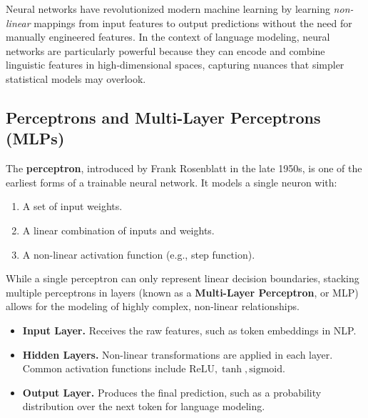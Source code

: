 \noindent
Neural networks have revolutionized modern machine learning by learning \emph{non-linear} mappings from input features to output predictions without the need for manually engineered features. In the context of language modeling, neural networks are particularly powerful because they can encode and combine linguistic features in high-dimensional spaces, capturing nuances that simpler statistical models may overlook.

\subsection{Perceptrons and Multi-Layer Perceptrons (MLPs)}
\noindent
The \textbf{perceptron}, introduced by Frank Rosenblatt in the late 1950s, is one of the earliest forms of a trainable neural network. It models a single neuron with:
\begin{enumerate}
    \item A set of input weights.
    \item A linear combination of inputs and weights.
    \item A non-linear activation function (e.g., step function).
\end{enumerate}
While a single perceptron can only represent linear decision boundaries, stacking multiple perceptrons in layers (known as a \textbf{Multi-Layer Perceptron}, or MLP) allows for the modeling of highly complex, non-linear relationships.

\begin{itemize}
    \item \textbf{Input Layer.} Receives the raw features, such as token embeddings in NLP.
    \item \textbf{Hidden Layers.} Non-linear transformations are applied in each layer. Common activation functions include $\text{ReLU}, \tanh, \text{sigmoid}$.
    \item \textbf{Output Layer.} Produces the final prediction, such as a probability distribution over the next token for language modeling.
\end{itemize}


